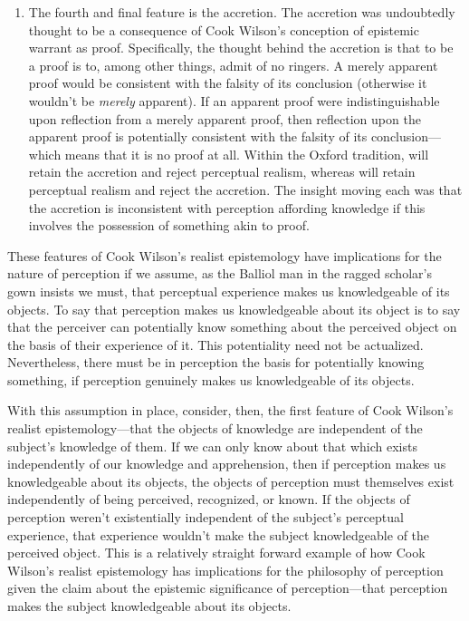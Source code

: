 \documentclass[12pt]{article}
\begin{document}
\begin{enumerate}[(1)]
	\item The fourth and final feature is the accretion. The accretion was undoubtedly thought to be a consequence of Cook Wilson's conception of epistemic warrant as proof. Specifically, the thought behind the accretion is that to be a proof is to, among other things, admit of no ringers. A merely apparent proof would be consistent with the falsity of its conclusion (otherwise it wouldn't be \emph{merely} apparent). If an apparent proof were indistinguishable upon reflection from a merely apparent proof, then reflection upon the apparent proof is potentially consistent with the falsity of its conclusion---which means that it is no proof at all. Within the Oxford tradition, \citet{Prichard:1938ve} will retain the accretion and reject perceptual realism, whereas \citet{Austin:1962lr} will retain perceptual realism and reject the accretion. The insight moving each was that the accretion is inconsistent with perception affording knowledge if this involves the possession of something akin to proof.
\end{enumerate}

These features of Cook Wilson's realist epistemology have implications for the nature of perception if we assume, as the Balliol man in the ragged scholar's gown insists we must, that perceptual experience makes us knowledgeable of its objects. To say that perception makes us knowledgeable about its object is to say that the perceiver can potentially know something about the perceived object on the basis of their experience of it. This potentiality need not be actualized. Nevertheless, there must be in perception the basis for potentially knowing something, if perception genuinely makes us knowledgeable of its objects.

With this assumption in place, consider, then, the first feature of Cook Wilson's realist epistemology---that the objects of knowledge are independent of the subject's knowledge of them. If we can only know about that which exists independently of our knowledge and apprehension, then if perception makes us knowledgeable about its objects, the objects of perception must themselves exist independently of being perceived, recognized, or known. If the objects of perception weren't existentially independent of the subject's perceptual experience, that experience wouldn't make the subject knowledgeable of the perceived object. This is a relatively straight forward example of how Cook Wilson's realist epistemology has implications for the philosophy of perception given the claim about the epistemic significance of perception---that perception makes the subject knowledgeable about its objects.
\end{document}
